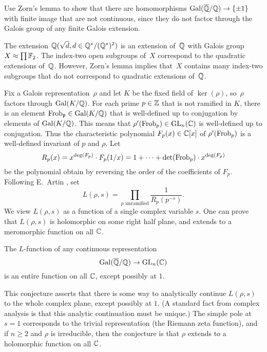 {\begin{exercise}
	
	\begin{hint}
		Use Zorn's lemma to show that there are homomorphisms
		$\operatorname{Gal}(\overline{\mathbb{Q}}/\mathbb{Q})\to\{\pm 1\}$ with finite image that are not continuous,
		since they do not factor through the Galois group of any
		finite Galois extension.
	\end{hint}
	
	\begin{hint}
		The extension $\mathbb{Q}(\sqrt{d}, d \in \mathbb{Q}^*/(\mathbb{Q}^*)^2)$
		is an extension of~$\mathbb{Q}$ with Galois group $X\approx \prod \mathbb{F}_2$.
		The index-two open subgroups of~$X$ correspond to the quadratic
		extensions of~$\mathbb{Q}$. However, Zorn's lemma implies that~$X$
		contains many index-two subgroups that do not correspond to
		quadratic extensions of~$\mathbb{Q}$.
	\end{hint}
\end{exercise}

Fix a Galois representation~$\rho$ and let $K$ be the fixed field of
$\ker(\rho)$, so~$\rho$ factors through $\operatorname{Gal}(K/\mathbb{Q})$.  For each prime
$p\in\mathbb{Z}$ that is not ramified in $K$, there is an element
$\operatorname{Frob}_{\mathfrak{p}}\in\operatorname{Gal}(K/\mathbb{Q})$ that is well-defined up to conjugation by
elements of $\operatorname{Gal}(K/\mathbb{Q})$.  This means that $\rho'(\operatorname{Frob}_p)\in
\operatorname{GL}_n(\mathbb{C})$ is well-defined up to conjugation.  Thus the characteristic
polynomial $F_p(x)\in\mathbb{C}[x]$ of $\rho'(\operatorname{Frob}_p)$ is a well-defined
invariant of $p$ and $\rho$.  Let
$$R_p(x) = x^{\deg(F_p)}\cdot F_p(1/x) = 1 + \cdots +
\det(\operatorname{Frob}_p)\cdot x^{\deg(F_p)}$$
be the polynomial obtain
by reversing the order of the coefficients of $F_p$.
Following E.~Artin \cite{artin:conjecture, artin:conjecture2}, set
\begin{equation}\label{eqn:artin}
	L(\rho,s) = \prod_{p\text{ unramified}}\frac{1}{R_p(p^{-s})}.
\end{equation}
We view $L(\rho,s)$ as a function of a single complex variable $s$.
One can prove that $L(\rho,s)$ is holomorphic on some right
half plane, and extends to a meromorphic function on all $\mathbb{C}$.
\begin{conjecture}[Artin]\label{conj:artin}
	The $L$-function of any continuous representation $$\operatorname{Gal}(\overline{\mathbb{Q}}/\mathbb{Q})\to\operatorname{GL}_n(\mathbb{C})$$
	is an entire function on all $\mathbb{C}$, except possibly at $1$.
\end{conjecture}
This conjecture asserts that there is some way to analytically continue
$L(\rho,s)$ to the whole complex plane, except possibly at $1$.
(A standard fact from complex analysis is that this analytic
continuation must be unique.)
The simple pole at $s=1$ corresponds to the trivial representation (the
Riemann zeta function), and if $n\geq 2$ and $\rho$ is irreducible,
then the conjecture is that $\rho$ extends to a holomorphic function
on all $\mathbb{C}$.

}
